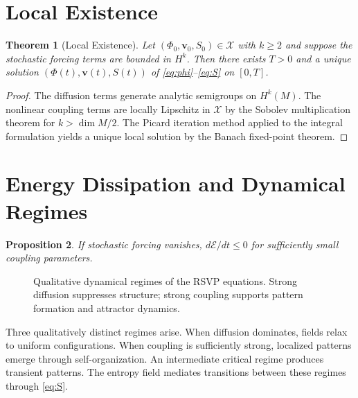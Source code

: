 \documentclass[12pt,a4paper,oneside]{book}
\numberwithin{equation}{chapter}
\theoremstyle{plain}
\newtheorem{theorem}{Theorem}[chapter]
\newtheorem{proposition}[theorem]{Proposition}
\theoremstyle{definition}
\theoremstyle{remark}
\begin{document}
\section{Local Existence}

\begin{theorem}[Local Existence]
\label{thm:local-existence}
Let $(\Phi_0,\mathbf{v}_0,S_0) \in \mathcal{X}$ with $k \geq 2$ and
suppose the stochastic forcing terms are bounded in $H^k$. Then there
exists $T > 0$ and a unique solution $(\Phi(t),\mathbf{v}(t),S(t))$
of \eqref{eq:phi}--\eqref{eq:S} on $[0,T]$.
\end{theorem}

\begin{proof}
The diffusion terms generate analytic semigroups on $H^k(M)$. The
nonlinear coupling terms are locally Lipschitz in $\mathcal{X}$ by the
Sobolev multiplication theorem for $k > \dim M/2$. The Picard
iteration method applied to the integral formulation yields a unique
local solution by the Banach fixed-point theorem.
\end{proof}

\section{Energy Dissipation and Dynamical Regimes}

\begin{proposition}
If stochastic forcing vanishes, $d\mathcal{E}/dt \leq 0$ for
sufficiently small coupling parameters.
\end{proposition}

\begin{figure}[htbp]
\centering
{}
\caption{Qualitative dynamical regimes of the RSVP equations. Strong
diffusion suppresses structure; strong coupling supports pattern
formation and attractor dynamics.}
\label{fig:rsvp-regimes}
\end{figure}

Three qualitatively distinct regimes arise. When diffusion dominates,
fields relax to uniform configurations. When coupling is sufficiently
strong, localized patterns emerge through self-organization. An
intermediate critical regime produces transient patterns. The entropy
field mediates transitions between these regimes through
\eqref{eq:S}.
\end{document}
